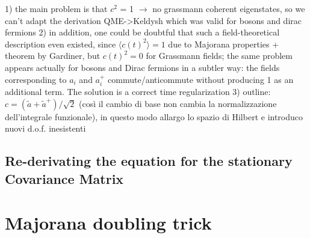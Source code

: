 \documentclass[a4paper,11pt]{article}
\theoremstyle{remark}
\newcommand{\mean}[1]{\ensuremath{\langle #1 \rangle}}
\newcommand{\ra}{\rightarrow}
\newcommand{\np}{\vskip 1.3cm}
\begin{document}
  
  


  1) the main problem is that $c^2$ = 1 $\ra$ no grassmann coherent eigenstates, so we can't adapt the derivation QME->Keldysh which was valid for bosons and dirac fermions
  2) in addition, one could be doubtful that such a field-theoretical description even existed, since $\mean{c(t)^2}=1$ due to Majorana properties + theorem by Gardiner, but $c(t)^2=0$ for Grassmann fields; the same problem appears actually for bosons and Dirac fermions in a subtler way: the fields corresponding to $a_i$ and $a_i^+$ commute/anticommute without producing 1 as an additional term. The solution is a correct time regularization
  3) outline: $c = (\tilde{a} + \tilde{a}^+)/\sqrt{2}$ (così il cambio di base non cambia la normalizzazione dell'integrale funzionale), in questo modo allargo lo spazio di Hilbert e introduco nuovi d.o.f. inesistenti
  \np
  \subsection{Re-derivating the equation for the stationary Covariance Matrix}
  \np
  
  
  
 \appendix
 \section{Majorana doubling trick}
 \label{sec:majorana_doubling_theory}
    
   
   
{}
  
\end{document}
